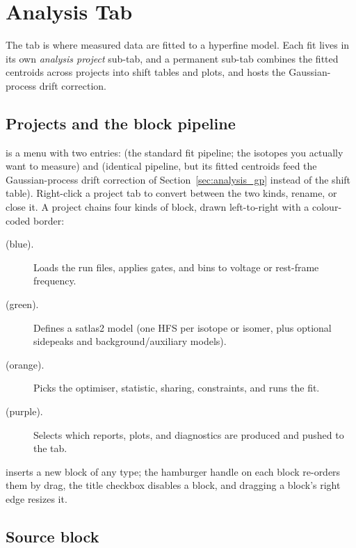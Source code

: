 \section{Analysis Tab}
\label{sec:analysis}

The  tab is where measured data are fitted to a
hyperfine model. Each fit lives in its own \emph{analysis project}
sub-tab, and a permanent 
sub-tab combines the fitted centroids across projects into shift
tables and plots, and hosts the Gaussian-process drift correction.

\subsection{Projects and the block pipeline}

 is a menu with two entries:
 (the standard fit pipeline; the isotopes you
actually want to measure) and  (identical
pipeline, but its fitted centroids feed the Gaussian-process drift
correction of Section~\ref{sec:analysis_gp} instead of the shift
table). Right-click a project tab to convert between the two kinds,
rename, or close it. A project chains four kinds of block, drawn
left-to-right with a colour-coded border:

\begin{description}
    \item[ (blue).] Loads the run files, applies gates,
        and bins to voltage or rest-frame frequency.
    \item[ (green).] Defines a satlas2 model
        (one HFS per isotope or isomer, plus optional sidepeaks and
        background/auxiliary models).
    \item[ (orange).] Picks the optimiser, statistic,
        sharing, constraints, and runs the fit.
    \item[ (purple).] Selects which reports, plots, and
        diagnostics are produced and pushed to the  tab.
\end{description}

 inserts a new block of any type; the hamburger
handle on each block re-orders them by drag, the title checkbox
disables a block, and dragging a block's right edge resizes it.

\subsection{Source block}

